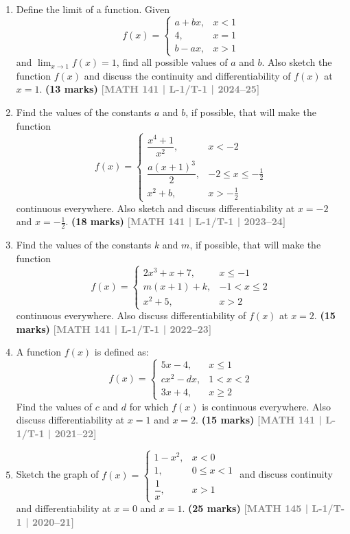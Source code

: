 \documentclass[12pt,a3paper]{article}
\newcommand{\yr}[1]{\hfill\textcolor{gray}{\small\textbf{[#1]}}}
\newcommand{\mk}[1]{\textcolor{orange!70!black}{\small\textbf{(#1 marks)}}}
\begin{document}
\begin{enumerate}
    
\item Define the limit of a function. Given
    \[
      f(x)=\begin{cases} a+bx, & x<1 \\ 4, & x=1 \\ b-ax, & x>1 \end{cases}
    \]
    and $\displaystyle\lim_{x\to 1}f(x)=1$, find all possible values of $a$ and $b$.
    Also sketch the function $f(x)$ and discuss the continuity and differentiability
    of $f(x)$ at $x=1$. \mk{13} \yr{MATH 141 | L-1/T-1 | 2024--25} 
  
\item Find the values of the constants $a$ and $b$, if possible, that will make the function
\[
f(x)=\begin{cases}\dfrac{x^{4}+1}{x^{2}}, & x<-2\\[6pt] \dfrac{a(x+1)^{3}}{2}, & -2\le x\le-\tfrac{1}{2}\\[6pt] x^{2}+b, & x>-\tfrac{1}{2}\end{cases}
\]
continuous everywhere. Also sketch and discuss differentiability at $x=-2$ and $x=-\tfrac{1}{2}$.
\mk{18} \yr{MATH 141 | L-1/T-1 | 2023--24}

\item Find the values of the constants $k$ and $m$, if possible, that will make the function
\[
f(x)=\begin{cases}2x^{3}+x+7, & x\le -1\\ m(x+1)+k, & -1<x\le 2\\ x^{2}+5, & x>2\end{cases}
\]
continuous everywhere. Also discuss differentiability of $f(x)$ at $x=2$.
\mk{15} \yr{MATH 141 | L-1/T-1 | 2022--23}

\item A function $f(x)$ is defined as:
\[
f(x)=\begin{cases}5x-4, & x\le 1\\ cx^{2}-dx, & 1<x<2\\ 3x+4, & x\ge 2\end{cases}
\]
Find the values of $c$ and $d$ for which $f(x)$ is continuous everywhere. Also discuss differentiability at $x=1$ and $x=2$.
\mk{15} \yr{MATH 141 | L-1/T-1 | 2021--22}

\item Sketch the graph of $f(x)=\begin{cases}1-x^{2}, & x<0\\ 1, & 0\le x<1\\ \dfrac{1}{x}, & x>1\end{cases}$ and discuss continuity and differentiability at $x=0$ and $x=1$.
\mk{25} \yr{MATH 145 | L-1/T-1 | 2020--21}


\end{enumerate}
\end{document}
